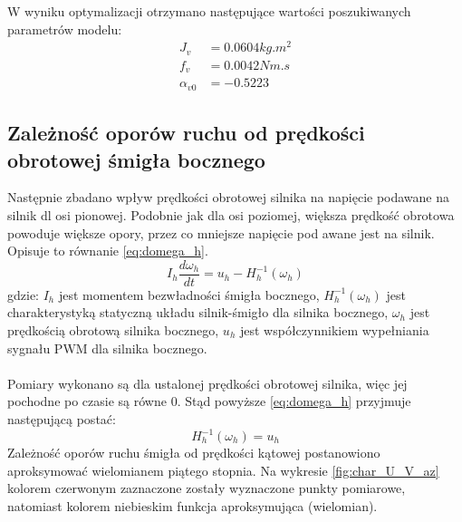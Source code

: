 \documentclass[11pt,a4paper]{article}
\begin{document}
W wyniku optymalizacji otrzymano następujące wartości poszukiwanych parametrów modelu:
\begin{equation}
\begin{aligned}
J_v &= 0.0604\si{kg.m^2}\\
f_v &= 0.0042\si{Nm.s}\\
\alpha_{v0} &= -0.5223
\end{aligned}
\end{equation}

\subsection{Zależność oporów ruchu od prędkości obrotowej śmigła bocznego}
Następnie zbadano wpływ prędkości obrotowej silnika na napięcie podawane na silnik dl osi pionowej. Podobnie jak dla osi poziomej, większa prędkość obrotowa powoduje większe opory, przez co mniejsze napięcie pod awane jest na silnik. Opisuje to równanie \eqref{eq:domega_h}.
\begin{equation}
I_h\frac{d\omega_h}{dt} = u_h - H_h^{-1}(\omega_h)
\label{eq:domega_h}
\end{equation}
\noindent gdzie:\newline
\(I_h\) jest momentem bezwładności śmigła bocznego,\newline
\(H_h^{-1}(\omega_h)\) jest charakterystyką statyczną układu silnik-śmigło dla silnika bocznego,\newline
\(\omega_h\) jest prędkością obrotową silnika bocznego,\newline
\(u_h\) jest współczynnikiem wypełniania sygnału PWM dla silnika bocznego.
\paragraph*{}
Pomiary wykonano są dla ustalonej prędkości obrotowej silnika, więc jej pochodne po czasie są równe \(0\). Stąd powyższe \eqref{eq:domega_h} przyjmuje następującą postać:
\begin{equation}
H_h^{-1}(\omega_h) = u_h
\end{equation}
Zależność oporów ruchu śmigła od prędkości kątowej postanowiono aproksymować wielomianem piątego stopnia. Na wykresie \ref{fig:char_U_V_az} kolorem czerwonym zaznaczone zostały wyznaczone punkty pomiarowe, natomiast kolorem niebieskim funkcja aproksymująca (wielomian).
\end{document}
